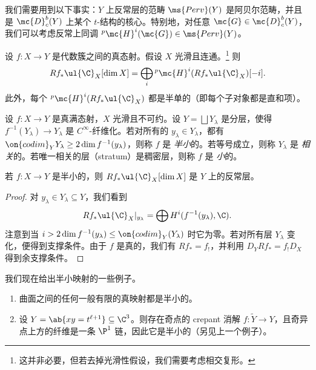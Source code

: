 我们需要用到以下事实：\(Y\) 上反常层的范畴 \(\ms{Perv}(Y)\) 是阿贝尔范畴，并且是 \(\mc{D}_c^b(Y)\) 上某个 \(t\)-结构的核心。特别地，对任意 \(\mc{G} \in \mc{D}_c^b (Y)\)，我们可以考虑反常上同调 \(^p\mc{H}^i(\mc{G}) \in \ms{Perv}(Y)\)。

\begin{thm}
    设 \(f \colon X \to Y\) 是代数簇之间的真态射。假设 \(X\) 光滑且连通。\footnote{这并非必要，但若去掉光滑性假设，我们需要考虑相交复形。} 则
    \[ R f_* \ul{\C}_X [\dim X] = \bigoplus_{i} {^p\mc{H}^i}(R f_* \ul{\C}_X)[-i]. \]
    此外，每个 \(^p\mc{H}^i (R f_* \ul{\C}_X)\) 都是半单的（即每个子对象都是直和项）。
\end{thm}

\begin{defn}
    设 \(f \colon X \to Y\) 是真满态射，\(X\) 光滑且不可约。设 \(Y = \bigsqcup Y_{\lambda}\) 是分层，使得 \(f^{-1}(Y_{\lambda}) \to Y_{\lambda}\) 是 \(C^{\infty}\)-纤维化。若对所有的 \(y_{\lambda} \in Y_{\lambda}\)，都有 \(\on{codim}_Y Y_{\lambda} \geq 2 \dim f^{-1} (y_{\lambda})\)，则称 \(f\) 是 \textit{半小}的。若等号成立，则称 \(Y_{\lambda}\) 是 \textit{相关}的。若唯一相关的层（stratum）是稠密层，则称 \(f\) 是 \textit{小}的。
\end{defn}

\begin{thm}
    若 \(f \colon X \to Y\) 是半小的，则 \(R f_* \ul{\C}_X [\dim X]\) 是 \(Y\) 上的反常层。
\end{thm}

\begin{proof}
    对 \(y_{\lambda} \in Y_{\lambda} \subseteq Y\)，我们看到
    \[ R f_* \ul{\C}_X |_{y_{\lambda}} = \bigoplus H^i (f^{-1}(y_{\lambda}), \C). \]
    注意到当 \(i > 2 \dim f^{-1}(y_{\lambda}) \leq \on{codim}_Y (Y_{\lambda})\) 时它为零。若对所有层 \(Y_{\lambda}\) 变化，便得到支撑条件。由于 \(f\) 是真的，我们有 \(R f_* = f_!\)，并利用 \(D_Y R f_* = f_! D_X\) 得到余支撑条件。
\end{proof}

\begin{exms}
    我们现在给出半小映射的一些例子。
    \begin{enumerate}
        \item 曲面之间的任何一般有限的真映射都是半小的。
        \item 设 \(Y = \ab\{xy = t^{\ell+1}\} \subseteq \C^3\)。则存在奇点的 crepant 消解 \(f \colon \tilde{Y} \to Y\)，且奇异点上方的纤维是一条 \(\P^1\) 链，因此它是半小的（另见上一个例子）。
    \end{enumerate}
\end{exms}

